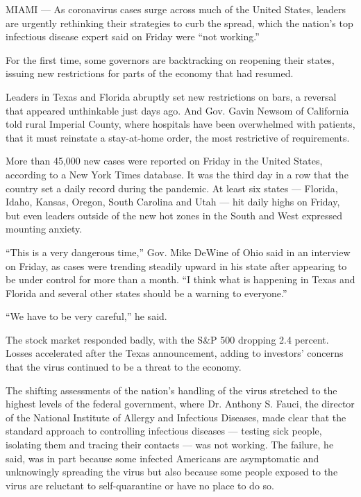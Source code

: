 MIAMI --- As coronavirus cases surge across much of the United States,
leaders are urgently rethinking their strategies to curb the spread,
which the nation's top infectious disease expert said on Friday were
``not working.''

For the first time, some governors are backtracking on reopening their
states, issuing new restrictions for parts of the economy that had
resumed.

Leaders in Texas and Florida abruptly set new restrictions on bars, a
reversal that appeared unthinkable just days ago. And Gov. Gavin Newsom
of California told rural Imperial County, where hospitals have been
overwhelmed with patients, that it must reinstate a stay-at-home order,
the most restrictive of requirements.

More than 45,000 new cases were reported on Friday in the United States,
according to a New York Times database. It was the third day in a row
that the country set a daily record during the pandemic. At least six
states --- Florida, Idaho, Kansas, Oregon, South Carolina and Utah ---
hit daily highs on Friday, but even leaders outside of the new hot zones
in the South and West expressed mounting anxiety.

``This is a very dangerous time,'' Gov. Mike DeWine of Ohio said in an
interview on Friday, as cases were trending steadily upward in his state
after appearing to be under control for more than a month. ``I think
what is happening in Texas and Florida and several other states should
be a warning to everyone.''

``We have to be very careful,'' he said.

The stock market responded badly, with the S\&P 500 dropping 2.4
percent. Losses accelerated after the Texas announcement, adding to
investors' concerns that the virus continued to be a threat to the
economy.

The shifting assessments of the nation's handling of the virus stretched
to the highest levels of the federal government, where Dr. Anthony S.
Fauci, the director of the National Institute of Allergy and Infectious
Diseases, made clear that the standard approach to controlling
infectious diseases --- testing sick people, isolating them and tracing
their contacts --- was not working. The failure, he said, was in part
because some infected Americans are asymptomatic and unknowingly
spreading the virus but also because some people exposed to the virus
are reluctant to self-quarantine or have no place to do so.

